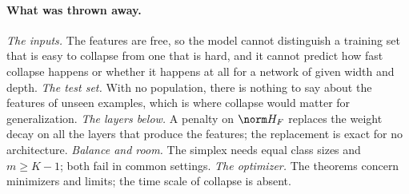 \begin{refsection}
\paragraph{What was thrown away.} \emph{The inputs.} The features are free, so the model cannot distinguish a training set that is easy to collapse from one that is hard, and it cannot predict how fast collapse happens or whether it happens at all for a network of given width and depth. \emph{The test set.} With no population, there is nothing to say about the features of unseen examples, which is where collapse would matter for generalization. \emph{The layers below.} A penalty on $\norm H_F$ replaces the weight decay on all the layers that produce the features; the replacement is exact for no architecture. \emph{Balance and room.} The simplex needs equal class sizes and $m\ge K-1$; both fail in common settings. \emph{The optimizer.} The theorems concern minimizers and limits; the time scale of collapse is absent.


\end{refsection}
